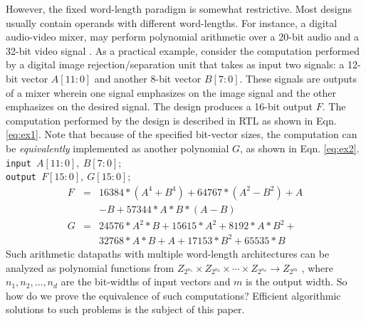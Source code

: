 However, the fixed word-length paradigm is somewhat restrictive. Most
designs usually contain operands with different word-lengths.  For
instance, a digital audio-video mixer, may perform polynomial
arithmetic over a 20-bit audio and a 32-bit video signal
\cite{mathews:book}. As a practical example, consider the computation
performed by a digital image rejection/separation unit that takes as
input two signals: a 12-bit vector $A[11:0]$ and another 8-bit vector
$B[7:0]$. These signals are outputs of a mixer wherein one signal
emphasizes on the image signal and the other emphasizes on the desired
signal. The design produces a 16-bit output $F$. The computation
performed by the design is described in RTL as shown in
Eqn. \ref{eq:ex1}. Note that because of the specified bit-vector
sizes, the computation can be {\it equivalently} implemented as
another polynomial $G$, as shown in Eqn. \ref{eq:ex2}.\\
%
{\small
\texttt{input $A[11:0], ~B[7:0]$};\\
\texttt{output $F[15:0],~G[15:0]$};\\
\vspace{-0.1in}
\begin{eqnarray}
F &=& 16384* (A^4 + B^4) + 64767 * (A^2 - B^2) + A \nonumber \\
      & & - B + 57344 * A * B * (A - B) \label{eq:ex1} \\
G &=& 24576* A^2 *B + 15615* A^2 + 8192* A*B^2 + \nonumber \\
      & & 32768*A * B + A + 17153*B^2 + 65535*B \label{eq:ex2}
\end{eqnarray}
}
%
Such arithmetic datapaths with multiple word-length architectures can
be analyzed as polynomial functions from  $Z_{2^{n_1}}
\times Z_{2^{n_2}} \times \cdots \times Z_{2^{n_d}} \rightarrow
Z_{2^m}$ \cite{chen_96}, where $n_1, n_2, \ldots, n_d$ are the
bit-widths of input vectors and $m$ is the output width. So how do we
prove the equivalence of such computations? Efficient algorithmic
solutions to such problems is the subject of this paper.

